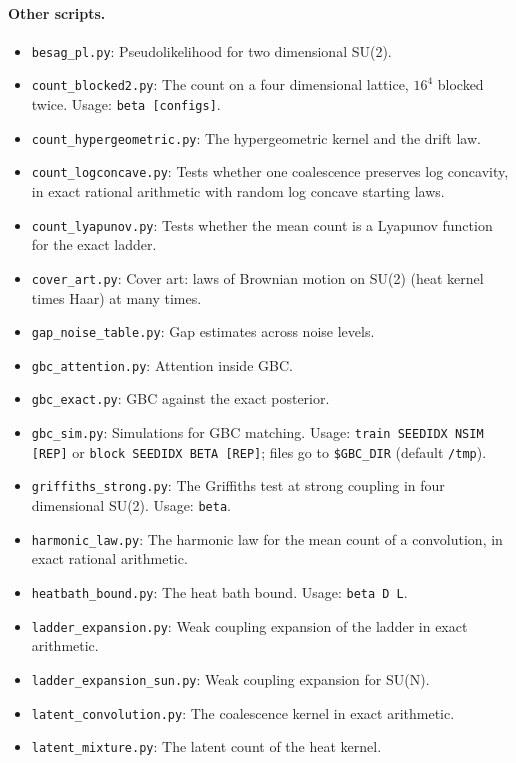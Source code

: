 \paragraph{Other scripts.}\nopagebreak
\begin{itemize}\setlength{\itemsep}{0pt}\setlength{\parskip}{0pt}
\item \texttt{besag\_pl.py}: Pseudolikelihood for two dimensional SU(2).
\item \texttt{count\_blocked2.py}: The count on a four dimensional lattice, $16^4$ blocked twice. Usage: \texttt{beta [configs]}.
\item \texttt{count\_hypergeometric.py}: The hypergeometric kernel and the drift law.
\item \texttt{count\_logconcave.py}: Tests whether one coalescence preserves log concavity, in exact rational arithmetic with random log concave starting laws.
\item \texttt{count\_lyapunov.py}: Tests whether the mean count is a Lyapunov function for the exact ladder.
\item \texttt{cover\_art.py}: Cover art: laws of Brownian motion on SU(2) (heat kernel times Haar) at many times.
\item \texttt{gap\_noise\_table.py}: Gap estimates across noise levels.
\item \texttt{gbc\_attention.py}: Attention inside GBC.
\item \texttt{gbc\_exact.py}: GBC against the exact posterior.
\item \texttt{gbc\_sim.py}: Simulations for GBC matching. Usage: \texttt{train SEEDIDX NSIM [REP]} or \texttt{block SEEDIDX BETA [REP]}; files go to \texttt{\$GBC\_DIR} (default \texttt{/tmp}).
\item \texttt{griffiths\_strong.py}: The Griffiths test at strong coupling in four dimensional SU(2). Usage: \texttt{beta}.
\item \texttt{harmonic\_law.py}: The harmonic law for the mean count of a convolution, in exact rational arithmetic.
\item \texttt{heatbath\_bound.py}: The heat bath bound. Usage: \texttt{beta D L}.
\item \texttt{ladder\_expansion.py}: Weak coupling expansion of the ladder in exact arithmetic.
\item \texttt{ladder\_expansion\_sun.py}: Weak coupling expansion for SU(N).
\item \texttt{latent\_convolution.py}: The coalescence kernel in exact arithmetic.
\item \texttt{latent\_mixture.py}: The latent count of the heat kernel.

\end{itemize}
